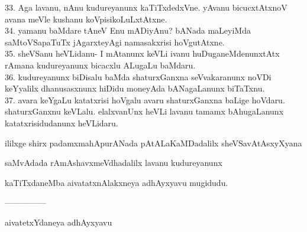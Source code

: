 \documentclass{article}
\begin{document}
33. Aga lavanu, nAnu kudureyanunx kaTiTxdedxVne. yAvanu bicucxtAtxnoV avana meVle kushanu koVpisikoLuLxtAtxne.\\
34. yamanu baMdare tAneV Enu mADiyAnu? bANada maLeyiMda saMtoVSapaTuTx jAgarxteyAgi namasakxrisi hoVgutAtxne.\\
35. sheVSanu heVLidanu- I mAtanunx keVLi ivanu huDuganeMdenunxtAtx rAmana kudureyanunx bicacxlu ALugaLu baMdaru.\\
36. kudureyanunx biDisalu baMda shaturxGanxna seVvakaranunx noVDi keYyalilx dhanusasxnunx hiDidu moneyAda bANagaLanunx biTaTxnu.\\
37. avara keYgaLu katatxrisi hoVgalu avaru shaturxGanxna baLige hoVdaru. shaturxGanxnu keVLalu. elalxvanUnx heVLi lavanu tamamx bAhugaLanunx katatxrisidudanunx heVLidaru.\\

\begin{center}
ililxge shirx padamxmahApurANada pAtALaKaMDadalilx sheVSavAtAsxyXyana
\end{center}

\begin{center}
saMvAdada rAmAshavxmeVdhadalilx lavanu kudureyanunx
\end{center}

\begin{center}
kaTiTxdaneMba aivatatxnAlakxneya adhAyxyavu mugidudu.
\end{center}

\begin{center}
---------------
\end{center}

\begin{center}
aivatetxYdaneya adhAyxyavu
\end{center}
\end{document}
